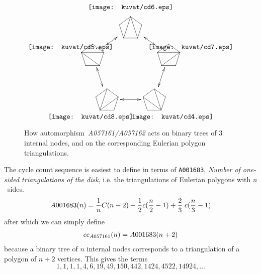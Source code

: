 \documentclass[11pt]{article} %
\newcommand{\eeq}{\end{equation}}
\newcommand{\beql}[1]{\begin{equation}\label{#1}}
\def\oratio#1#2{{#1\over #2}}
\newcommand{\autname}[1]{{\it *#1}}
\newcommand{\automorphism}[1]{automorphism~\autname{#1}}
\newcommand{\EISseq}[1]{{\tt #1}}
\begin{document}
\begin{figure}[!ht]
\begin{center}
\[
\xy
(0,30)*{\texttt{[image: kuvat/cd6.eps]}}="1o";
(0,20)*+{ \xy 0;/r.07pc/:
(0,20)*{}="1";
(19,6.2)*{}="2";
(11.8,-16.2)*{}="3";
(-11.8,-16.2)*{}="4";
(-19,6.2)*{}="5";
{\ar@{-} "1";"2"};
{\ar@{-} "3";"2"};
{\ar@{-} "4";"3"};
{\ar@{-} "5";"4"};
{\ar@{-} "5";"1"};
{\ar@{-} "1";"3"};
{\ar@{-} "1";"4"};
\endxy}="1";
(30,10)*{\texttt{[image: kuvat/cd7.eps]}}="2o";
(19,6.2)*+{ \xy 0;/r.07pc/:
(0,20)*{}="1";
(19,6.2)*{}="2";
(11.8,-16.2)*{}="3";
(-11.8,-16.2)*{}="4";
(-19,6.2)*{}="5";
{\ar@{-} "1";"2"};
{\ar@{-} "3";"2"};
{\ar@{-} "4";"3"};
{\ar@{-} "5";"4"};
{\ar@{-} "5";"1"};
{\ar@{-} "2";"4"};
{\ar@{-} "2";"5"};
\endxy}="2";
(20,-25)*{\texttt{[image: kuvat/cd4.eps]}}="3o";
(11.8,-16.2)*+{ \xy 0;/r.07pc/:
(0,20)*{}="1";
(19,6.2)*{}="2";
(11.8,-16.2)*{}="3";
(-11.8,-16.2)*{}="4";
(-19,6.2)*{}="5";
{\ar@{-} "1";"2"};
{\ar@{-} "3";"2"};
{\ar@{-} "4";"3"};
{\ar@{-} "5";"4"};
{\ar@{-} "5";"1"};
{\ar@{-} "3";"5"};
{\ar@{-} "3";"1"};
\endxy}="3";
(-20,-25)*{\texttt{[image: kuvat/cd8.eps]}}="4o";
(-11.8,-16.2)*+{ \xy 0;/r.07pc/:
(0,20)*{}="1";
(19,6.2)*{}="2";
(11.8,-16.2)*{}="3";
(-11.8,-16.2)*{}="4";
(-19,6.2)*{}="5";
{\ar@{-} "1";"2"};
{\ar@{-} "3";"2"};
{\ar@{-} "4";"3"};
{\ar@{-} "5";"4"};
{\ar@{-} "5";"1"};
{\ar@{-} "4";"1"};
{\ar@{-} "4";"2"};
\endxy}="4";
(-30,10)*{\texttt{[image: kuvat/cd5.eps]}}="5o";
(-19,6.2)*+{ \xy 0;/r.07pc/:
(0,20)*{}="1";
(19,6.2)*{}="2";
(11.8,-16.2)*{}="3";
(-11.8,-16.2)*{}="4";
(-19,6.2)*{}="5";
{\ar@{-} "1";"2"};
{\ar@{-} "3";"2"};
{\ar@{-} "4";"3"};
{\ar@{-} "5";"4"};
{\ar@{-} "5";"1"};
{\ar@{-} "5";"2"};
{\ar@{-} "5";"3"};
\endxy}="5";
{\ar@{<->} "1";"2"};
{\ar@{<->} "3";"2"};
{\ar@{<->} "4";"3"};
{\ar@{<->} "5";"4"};
{\ar@{<->} "5";"1"};
\endxy
\]
\caption{How \automorphism{A057161/A057162} acts
on binary trees of 3 internal nodes, and on the corresponding
Eulerian polygon triangulations.}
\end{center}
\end{figure}

The cycle count sequence is easiest to define in terms of
\EISseq{A001683}, {\em Number of one-sided triangulations of the
  disk},
i.e. the triangulations of Eulerian polygons with $n$~sides.
\beql{EQa001683}
\aligned
  A001683(n) = \oratio{1}{n}C(n-2) + \oratio{1}{2}c(\oratio{n}{2}-1) + \oratio{2}{3}\;c(\oratio{n}{3}-1)
\endaligned
\eeq
after which we can simply define
\beql{EQcc_A057161v1} %
\aligned
cc_{A057161}(n) = A001683(n+2)
\endaligned
\eeq
because a binary tree of $n$ internal nodes corresponds
to a triangulation of a polygon of $n+2$ vertices.
This gives the terms
$$
1,1,1,1,4,6,19,49,150,442,1424,4522,14924,\hdots
$$
\end{document}
